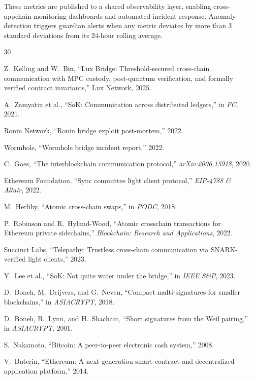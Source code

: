 \documentclass[11pt,a4paper]{article}
\begin{document}
These metrics are published to a shared observability layer, enabling cross-appchain monitoring dashboards and automated incident response. Anomaly detection triggers guardian alerts when any metric deviates by more than 3 standard deviations from its 24-hour rolling average.


\begin{thebibliography}{30}

Z.~Kelling and W.~Bin, ``Lux Bridge: Threshold-secured cross-chain communication with MPC custody, post-quantum verification, and formally verified contract invariants,'' Lux Network, 2025.

A.~Zamyatin et al., ``SoK: Communication across distributed ledgers,'' in \emph{FC}, 2021.

Ronin Network, ``Ronin bridge exploit post-mortem,'' 2022.

Wormhole, ``Wormhole bridge incident report,'' 2022.

C.~Goes, ``The interblockchain communication protocol,'' \emph{arXiv:2006.15918}, 2020.

Ethereum Foundation, ``Sync committee light client protocol,'' \emph{EIP-4788 \& Altair}, 2022.

M.~Herlihy, ``Atomic cross-chain swaps,'' in \emph{PODC}, 2018.

P.~Robinson and R.~Hyland-Wood, ``Atomic crosschain transactions for Ethereum private sidechains,'' \emph{Blockchain: Research and Applications}, 2022.

Succinct Labs, ``Telepathy: Trustless cross-chain communication via SNARK-verified light clients,'' 2023.

Y.~Lee et al., ``SoK: Not quite water under the bridge,'' in \emph{IEEE S\&P}, 2023.

D.~Boneh, M.~Drijvers, and G.~Neven, ``Compact multi-signatures for smaller blockchains,'' in \emph{ASIACRYPT}, 2018.

D.~Boneh, B.~Lynn, and H.~Shacham, ``Short signatures from the Weil pairing,'' in \emph{ASIACRYPT}, 2001.

S.~Nakamoto, ``Bitcoin: A peer-to-peer electronic cash system,'' 2008.

V.~Buterin, ``Ethereum: A next-generation smart contract and decentralized application platform,'' 2014.


\end{thebibliography}
\end{document}
